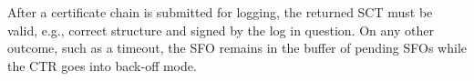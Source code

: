 After a certificate chain is submitted for logging, the returned SCT must be
valid, e.g., correct structure and signed by the log in question.  On any other
outcome, such as a timeout, the SFO remains in the buffer of pending SFOs while
the CTR goes into back-off mode.


